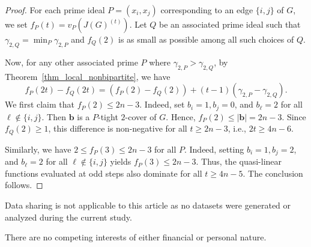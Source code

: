 \documentclass[12pt,amscd]{amsart}
\theoremstyle{definition}
\numberwithin{equation}{section}
\begin{document}
\begin{proof} 
For each prime ideal $P = (x_i,x_j)$ corresponding to an edge $\{i,j\}$ of $G$, we set $f_P(t) = v_P(J(G)^{(t)})$. Let $Q$ be an associated prime ideal such that $\gamma_{2,Q} = \min_{P} \gamma_{2,P}$ and $f_Q(2)$ is as small as possible among all such choices of $Q$.

Now, for any other associated prime $P$ where $\gamma_{2,P} > \gamma_{2,Q}$, by Theorem~\ref{thm_local_nonbipartite}, we have 
\[
f_P(2t) - f_Q(2t) = (f_P(2) - f_Q(2)) + (t-1)(\gamma_{2,P} - \gamma_{2,Q}).
\]
We first claim that $f_P(2) \le 2n-3$. Indeed, set $b_i = 1, b_j = 0$, and $b_\ell = 2$ for all $\ell \notin \{i,j\}$. Then $\mathbf{b}$ is a $P$-tight $2$-cover of $G$. Hence, $f_P(2) \le |\mathbf{b}| = 2n-3$. Since $f_Q(2) \ge 1$, this difference is non-negative for all $t \ge 2n-3$, i.e., $2t \ge 4n-6$.

Similarly, we have $2 \le f_P(3) \le 2n-3$ for all $P$. Indeed, setting $b_i = 1, b_j = 2$, and $b_\ell = 2$ for all $\ell \notin \{i,j\}$ yields $f_P(3) \le 2n-3$. Thus, the quasi-linear functions evaluated at odd steps also dominate for all $t \ge 4n-5$. The conclusion follows.
\end{proof}

  
\vspace{0.2cm}
 Data sharing is not applicable to this article as no datasets were generated or analyzed during the current study.
\vspace{0.2cm}

 There are no competing interests of either financial or personal nature.
\end{document}
